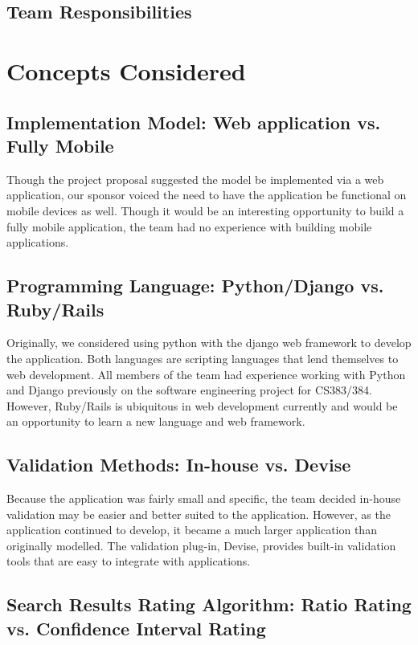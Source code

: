 \documentclass[12pt,english]{article}
\begin{document}
\subsection{Team Responsibilities}


\section{Concepts Considered}


\subsection{Implementation Model: Web application vs. Fully Mobile}

Though the project proposal suggested the model be implemented via
a web application, our sponsor voiced the need to have the application
be functional on mobile devices as well. Though it would be an interesting
opportunity to build a fully mobile application, the team had no experience
with building mobile applications.


\subsection{Programming Language: Python/Django vs. Ruby/Rails}

Originally, we considered using python with the django web framework
to develop the application. Both languages are scripting languages
that lend themselves to web development. All members of the team had
experience working with Python and Django previously on the software
engineering project for CS383/384. However, Ruby/Rails is ubiquitous
in web development currently and would be an opportunity to learn
a new language and web framework.


\subsection{Validation Methods: In-house vs. Devise}

Because the application was fairly small and specific, the team decided
in-house validation may be easier and better suited to the application.
However, as the application continued to develop, it became a much
larger application than originally modelled. The validation plug-in,
Devise, provides built-in validation tools that are easy to integrate
with applications.


\subsection{Search Results Rating Algorithm: Ratio Rating vs. Confidence Interval
Rating}
\end{document}
